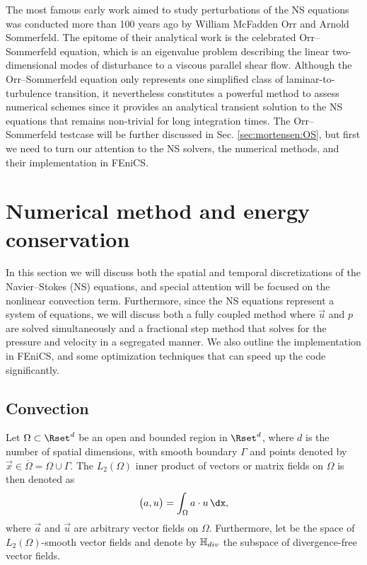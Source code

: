 The most famous early work aimed to study perturbations of the NS
equations was conducted more than 100 years ago by William McFadden
Orr and Arnold Sommerfeld. The epitome of their analytical work is the
celebrated Orr--Sommerfeld equation, which is an eigenvalue problem
describing the linear two-dimensional modes of disturbance to a
viscous parallel shear flow. Although the Orr--Sommerfeld equation only
represents one simplified class of laminar-to-turbulence transition,
it nevertheless constitutes a powerful method to assess numerical
schemes since it provides an analytical transient solution to the NS
equations that remains non-trivial for long integration times. The
Orr--Sommerfeld testcase will be further discussed in
Sec. \ref{sec:mortensen:OS}, but first we need to turn our attention
to the NS solvers, the numerical methods, and their implementation in
FEniCS.

\section{Numerical method and energy conservation}
\label{sec:mortensen:Numerical}

In this section we will discuss both the spatial and temporal
discretizations of the Navier--Stokes (NS) equations, and special
attention will be focused on the nonlinear convection
term. Furthermore, since the NS equations represent a system of
equations, we will discuss both a fully coupled method where $\vec{u}$
and $p$ are solved simultaneously and a fractional step method that
solves for the pressure and velocity in a segregated manner. We also
outline the implementation in FEniCS, and some optimization techniques
that can speed up the code significantly.

\subsection{Convection}
\label{sec:mortensen:Convection}

Let $\Omega \subset \Rset^d$ be an open and bounded region in
$\Rset^d$, where $d$ is the number of spatial dimensions, with smooth
boundary $\Gamma$ and points denoted by $\vec{x}\in
\overline{\Omega}=\Omega \cup \Gamma$. The $L_2(\Omega)$ inner product
of vectors or matrix fields on $\Omega$ is then denoted as
\begin{equation}
 \bigl( \vec{a},\vec{u} \bigr) = \int_{\Omega} \vec{a}\cdot \vec{u}\, \dx,
 \label{eq:mortensen:L2}
\end{equation}
where $\vec{a}$ and $\vec{u}$ are arbitrary vector fields on
$\Omega$. Furthermore, let \Hset be the space of $L_2(\Omega)$-smooth
vector fields and denote by $\mathbb{H}_{div}$ the subspace of
divergence-free vector fields.

